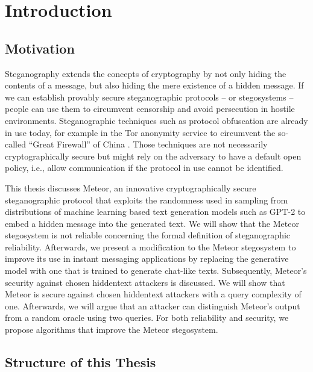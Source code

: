 \chapter{Introduction}

\section{Motivation}


Steganography extends the concepts of cryptography by not only hiding the contents of a message, but also hiding the mere existence of a hidden message.
If we can establish provably secure steganographic protocols -- or stegosystems -- people can use them to circumvent censorship and avoid persecution in hostile environments.
Steganographic techniques such as protocol obfuscation are already in use today, for example in the Tor anonymity service to circumvent the so-called ``Great Firewall'' of China \cite{TorBlocking2012}.
Those techniques are not necessarily cryptographically secure but might rely on the adversary to have a default open policy, i.e., allow communication if the protocol in use cannot be identified.

This thesis discusses Meteor, an innovative cryptographically secure steganographic protocol that exploits the randomness used in sampling from distributions of machine learning based text generation models such as GPT-2 to embed a hidden message into the generated text.
We will show that the Meteor stegosystem is not reliable concerning the formal definition of steganographic reliability.
Afterwards, we present a modification to the Meteor stegosystem to improve its use in instant messaging applications by replacing the generative model with one that is trained to generate chat-like texts.
Subsequently, Meteor's security against chosen hiddentext attackers is discussed.
We will show that Meteor is secure against chosen hiddentext attackers with a query complexity of one.
Afterwards, we will argue that an attacker can distinguish Meteor's output from a random oracle using two queries.
For both reliability and security, we propose algorithms that improve the Meteor stegosystem.


\section{Structure of this Thesis}

